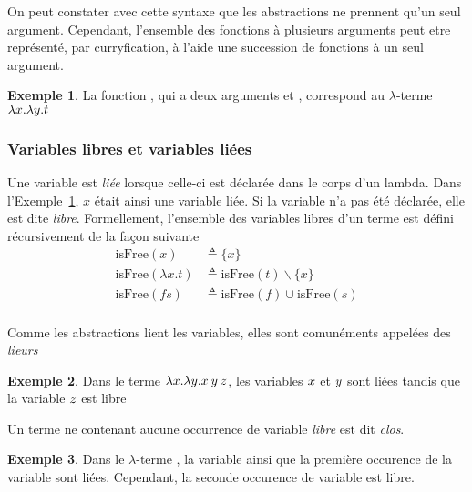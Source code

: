 \documentclass {article}
\theoremstyle{definition}
\newtheorem{example}{Exemple}
\theoremstyle{remark}
\begin{document}
On peut constater avec cette syntaxe que les abstractions ne prennent
qu'un seul argument. Cependant, l'ensemble des fonctions à plusieurs
arguments peut etre représenté, par curryfication, à l'aide une
succession de fonctions à un seul argument.

\begin{example}
  \label{example:id}
  La fonction , qui a deux arguments  et ,
  correspond au $\lambda$-terme $\lambda x. \lambda y. t$
\end{example} 


\subsubsection{Variables libres et variables liées}

\newcommand{\IsFree}{\mathrm{isFree}}


Une variable est \emph{liée} lorsque celle-ci est déclarée dans le corps d'un
lambda. Dans l'Exemple~\ref{example:id}, $x$ était ainsi une variable liée.
Si la variable n'a pas été déclarée, elle est dite
\emph{libre}. Formellement, l'ensemble des variables libres d'un terme est
défini récursivement de la façon suivante
%
\begin{align*}
  \IsFree(x) &\triangleq \{x\} \\
  \IsFree(\lambda x. t) &\triangleq \IsFree(t) \backslash \{x\} \\
  \IsFree(f s) &\triangleq \IsFree(f) \cup \IsFree(s) \\
\end{align*}

Comme les abstractions lient les variables, elles sont comunéments appelées des \emph{lieurs}

\begin{example}
  Dans le terme \(\lambda x. \lambda y. x\:y\:z\), 
  les variables $x$ et $y$ sont liées tandis que la variable $z$ est libre 
\end{example}


Un terme ne contenant aucune occurrence de variable \emph{libre} est dit \emph{clos}.

\begin{example}  
  \label{example:ouvert-clos}  
  Dans le $\lambda$-terme
  , la variable 
  ainsi que la première occurence de la variable  sont
  liées. Cependant, la seconde occurence de variable  est
  libre.
\end{example}
\end{document}

